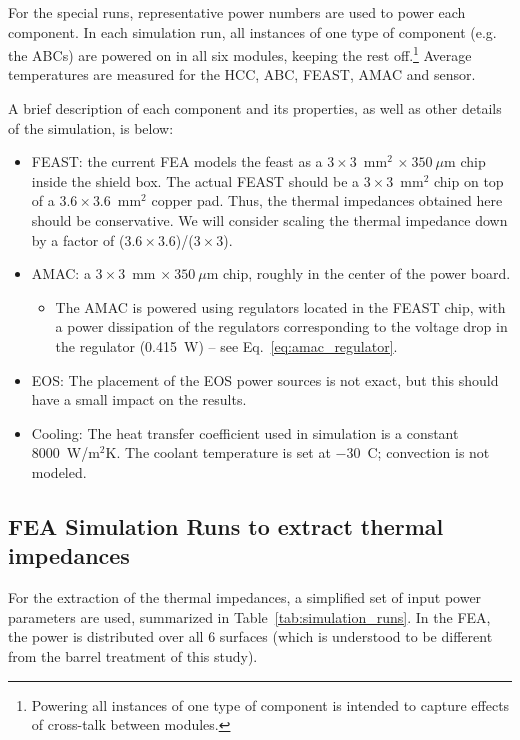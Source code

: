 For the special runs,
representative power numbers are used to power each component. In each simulation run, all instances
of one type of component (e.g. the ABCs) are powered on in all six modules, keeping the rest
off.\footnote{Powering all instances of one type of component is intended to capture effects of
cross-talk between modules.}
Average temperatures are measured for the HCC, ABC, FEAST, AMAC and sensor.

\def\thcc{\ensuremath{\overline{T}_\text{nHCC}}}
\def\tabc{\ensuremath{\overline{T}_\text{nABC}}}
\def\tfeast{\ensuremath{\overline{T}_\text{FEAST}}}
\def\tsensor{\ensuremath{T_\text{sensor}}}
\def\Rm{\ensuremath{{\text{R}m}}}

A brief description of each component and its properties, as well as other details
of the simulation, is below:
\begin{itemize}
\item FEAST: the current FEA models the feast as a $3\times3$~mm$^2$ $\times~350~\mu$m chip inside
the shield box. The actual FEAST should be a $3\times3$~mm$^2$ chip on top of a $3.6\times3.6$~mm$^2$
copper pad. Thus, the thermal impedances obtained here should be conservative. We will 
consider scaling the thermal impedance down by a factor of ($3.6\times3.6$)/($3\times3$).
\item AMAC: a $3\times3$~mm $\times~350~\mu$m chip, roughly in the center of the power board.
  \begin{itemize}
    \item The AMAC is powered using regulators located in the FEAST chip, with a power dissipation
      of the regulators corresponding to the voltage drop in the regulator (0.415~W) -- see Eq.~\ref{eq:amac_regulator}.
  \end{itemize}
\item EOS: The placement of the EOS power sources is not exact, but this should have a small impact
  on the results.
\item Cooling: The heat transfer coefficient used in simulation is a constant 8000~W/m$^{2}$K.
  The coolant temperature is set at $-30$~C; convection is not modeled.
\end{itemize}




\subsection{FEA Simulation Runs to extract thermal impedances}

For the extraction of the thermal impedances, a simplified set of input power parameters are used,
summarized in Table~\ref{tab:simulation_runs}.
In the FEA, the power is distributed over all 6 surfaces (which is understood to be different from
the barrel treatment of this study).

